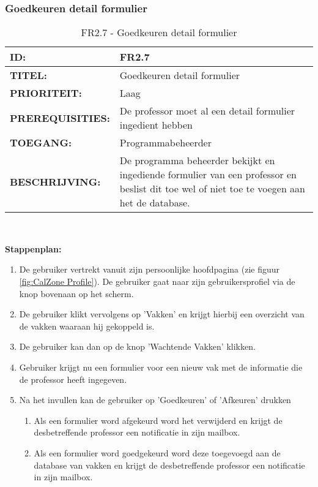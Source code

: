 \subsubsection{Goedkeuren detail formulier}     
\noindent\begin{table}[H]
            \begin{tabular}{l | p{10cm}}
                \textbf{ID:} & FR2.7 \\ \hline
                \textbf{TITEL:} & Goedkeuren detail formulier   \\ \hline
                \textbf{PRIORITEIT:} &  Laag \\ \hline
                \textbf{PREREQUISITIES:} & De professor moet al een detail formulier ingedient hebben\\ \hline
                \textbf{TOEGANG:} & Programmabeheerder \\ \hline
                \textbf{BESCHRIJVING:} & De programma beheerder bekijkt en ingediende formulier van een professor en beslist dit toe wel of niet toe te voegen aan het de database. 
            \end{tabular}\\
            \caption{FR2.7 - Goedkeuren detail formulier  }
            \label{tab:FR2.7 - Goedkeuren detail formulier  }
        \end{table}
 
\textbf{Stappenplan:}
	\begin{enumerate}
	\item De gebruiker vertrekt vanuit zijn persoonlijke hoofdpagina (zie figuur \ref{fig:CalZone Profile}). De gebruiker gaat naar zijn gebruikersprofiel via de knop bovenaan op het scherm.
	\item De gebruiker klikt vervolgens op 'Vakken' en krijgt hierbij een overzicht van de vakken waaraan hij gekoppeld is.
	\item De gebruiker kan dan op de knop 'Wachtende Vakken' klikken.
	\item Gebruiker krijgt nu een formulier voor een nieuw vak met de informatie die de professor heeft ingegeven.
	\item Na het invullen kan de gebruiker op 'Goedkeuren' of 'Afkeuren' drukken
		\begin{enumerate}
		\item Als een formulier word afgekeurd word het verwijderd en krijgt de desbetreffende professor een notificatie in zijn mailbox.
		\item Als een formulier word goedgekeurd word deze toegevoegd aan de database van vakken en krijgt de desbetreffende professor een notificatie in zijn mailbox.
		\end{enumerate}
	\end{enumerate}       
         

